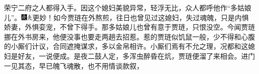 {荣宁二府之人都得入手。因这个媳妇美貌异常，轻浮无比，众人都呼他作“多姑娘儿”。{\includegraphics[width=3mm]{../Images/00004}\includegraphics[width=3mm]{../Images/00012}\footnotesize \kaishu 更妙！}如今贾琏在外熬煎，往日也曾见过这媳妇，失过魂魄，只是内惧娇妻，外惧娈宠，不曾下得手。那多姑娘儿也曾有意于贾琏，只恨没空。今闻贾琏挪在外书房来，他便没事也要走两趟去招惹。惹的贾琏似饥鼠一般，少不得和心腹的小厮们计议，合同遮掩谋求，多以金帛相许。小厮们焉有不允之理，况都和这媳妇是好友，一说便成。是夜二鼓人定，多浑虫醉昏在炕，贾琏便溜了来相会。进门一见其态，早已魄飞魂散，也不用情谈款叙，}
